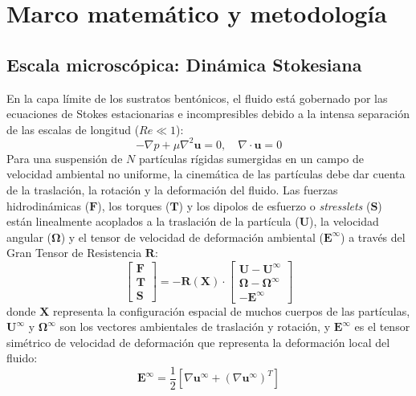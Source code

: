 \section{Marco matemático y metodología}
\label{sec:methodology}

\subsection{Escala microscópica: Dinámica Stokesiana}
En la capa límite de los sustratos bentónicos, el fluido está gobernado por las ecuaciones de Stokes estacionarias e incompresibles debido a la intensa separación de las escalas de longitud ($Re \ll 1$):
\begin{equation}
    -\nabla p + \mu \nabla^2 \bm{u} = 0, \quad \nabla \cdot \bm{u} = 0
\end{equation}
Para una suspensión de $N$ partículas rígidas sumergidas en un campo de velocidad ambiental no uniforme, la cinemática de las partículas debe dar cuenta de la traslación, la rotación y la deformación del fluido. Las fuerzas hidrodinámicas ($\bm{F}$), los torques ($\bm{T}$) y los dipolos de esfuerzo o \emph{stresslets} ($\bm{S}$) están linealmente acoplados a la traslación de la partícula ($\bm{U}$), la velocidad angular ($\bm{\Omega}$) y el tensor de velocidad de deformación ambiental ($\bm{E}^{\infty}$) a través del Gran Tensor de Resistencia $\bm{R}$:
\begin{equation}
    \begin{bmatrix}
        \bm{F} \\
        \bm{T} \\
        \bm{S}
    \end{bmatrix} = -\bm{R}(\bm{X}) \cdot 
    \begin{bmatrix}
        \bm{U} - \bm{U}^{\infty} \\
        \bm{\Omega} - \bm{\Omega}^{\infty} \\
        -\bm{E}^{\infty}
    \end{bmatrix}
\end{equation}
donde $\bm{X}$ representa la configuración espacial de muchos cuerpos de las partículas, $\bm{U}^{\infty}$ y $\bm{\Omega}^{\infty}$ son los vectores ambientales de traslación y rotación, y $\bm{E}^{\infty}$ es el tensor simétrico de velocidad de deformación que representa la deformación local del fluido:
\begin{equation}
    \bm{E}^{\infty} = \frac{1}{2} \left[ \nabla \bm{u}^{\infty} + (\nabla \bm{u}^{\infty})^T \right]
\end{equation}
